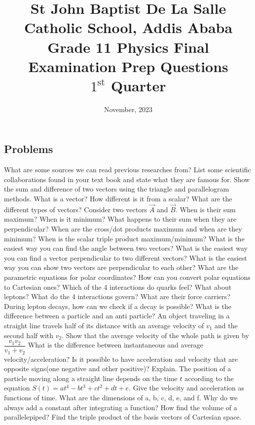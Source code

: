 \documentclass[12pt,addpoints]{exam}
\date{November, 2023}
\begin{document}
	\title{St John Baptist De La Salle Catholic School, Addis Ababa\\
		\large Grade 11 Physics Final Examination Prep Questions\\
		$1^\text{st}$ Quarter}
	\maketitle
	\subsection*{Problems}
				\begin{questions}
					\question What are some sources we can read previous researches from?
					\question List some scientific collaborations found in your text book and state what they are famous for.
					\question Show the sum and difference of two vectors using the triangle and parallelogram methods.
					\question What is a vector? How different is it from a scalar? What are the different types of vectors?
					\question Consider two vectors $\vec{A}$ and $\vec{B}$. When is their sum maximum? When is it minimum? What happens to their sum when they are perpendicular? When are the cross/dot products maximum and when are they minimum? When is the scalar triple product maximum/minimum?
					\question What is the easiest way you can find the angle between two vectors? 
					\question What is the easiest way you can find a vector perpendicular to two different vectors?
					\question What is the easiest way you can show two vectors are perpendicular to each other?
					\question What are the parametric equations for polar coordinates?
					\question How can you convert polar equations to Cartesian ones?
					\question Which of the 4 interactions do quarks feel? What about leptons?
					\question What do the 4 interactions govern? What are their force carriers?
					\question During lepton decays, how can we check if a decay is possible?
					\question What is the difference between a particle and an anti particle?
					\question An object traveling in a straight line travels half of its distance with an average velocity of $v_1$ and the second half with $v_2$. Show that the average velocity of the whole path is given by $\dfrac{v_1v_2}{v_1+v_2}$
					\question What is the difference between instantaneous and average velocity/acceleration?
					\question Is it possible to have acceleration and velocity that are opposite signs(one negative and other positive)? Explain. 
					\question The position of a particle moving along a straight line depends on the time $t$ according to the equation $S(t) = at^4-bt^3+ct^2+dt+e$. Give the velocity and acceleration as functions of time. What are the dimensions of a, b, c, d, e, and f.
					\question Why do we always add a constant after integrating a function?
					\question How find the volume of a parallelepiped?
					\question Find the triple product of the basis vectors of Cartesian space.
				\end{questions}
			
\end{document}

